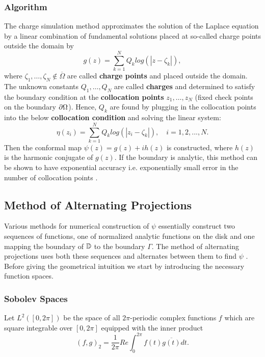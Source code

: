 \subsubsection{Algorithm}
The charge simulation method approximates the solution of the Laplace equation by a linear combination of fundamental solutions placed at so-called charge points outside the domain \cite{Amano1998_Amanosmethod} by 
\begin{equation}\label{eq:AmanosApproximation}
    g(z) = \sum_{k=1}^{N} Q_k log(|z-\zeta_k|),
\end{equation}
where $\zeta_1, \ldots, \zeta_N \notin\overline\Omega$ are called \textbf{charge points} and placed outside the domain. The unknown constants $Q_1, \ldots, Q_N$ are called \textbf{charges} and determined to satisfy the boundary condition at the \textbf{collocation points} $z_1, \ldots, z_N$ (fixed check points on the boundary $\partial\Omega$).
Hence, $Q_k$ are found by plugging in the collocation points into the below \textbf{collocation condition} and solving the linear system:
\begin{equation} \label{eq:collocationCondition}
    \eta(z_i) = \sum_{k=1}^{N} Q_k log(|z_i-\zeta_k|), \quad i=1,2,...,N.
\end{equation}
Then the conformal map $\psi(z)=g(z)+ih(z)$ is constructed, where $h(z)$ is the harmonic conjugate of $g(z)$.
If the boundary is analytic, this method can be shown to have exponential accuracy i.e. exponentially small error in the number of collocation points \cite{Amano1998_Amanosmethod}.


\subsection{Method of Alternating Projections}\label{chap:APMethod}
Various methods for numerical construction of $\psi$ essentially construct two sequences of functions, one of normalized analytic functions on the disk and one mapping the boundary of $\mathbb{D}$ to the boundary $\Gamma$.
The method of alternating projections uses both these sequences and alternates between them to find $\psi$ \cite{Wegmann1989_alternating_projections}.
Before giving the geometrical intuition we start by introducing the necessary function spaces.

\subsubsection{Sobolev Spaces}
Let $L^2([0,2\pi])$ be the space of all $2\pi$-periodic complex functions $f$ which are square integrable over $[0, 2\pi]$ equipped with the inner product 
\begin{equation}
    (f,g)_2= \frac{1}{2\pi}Re \int_{0}^{2\pi} f(t) \overline{g(t)} dt.
\end{equation}

